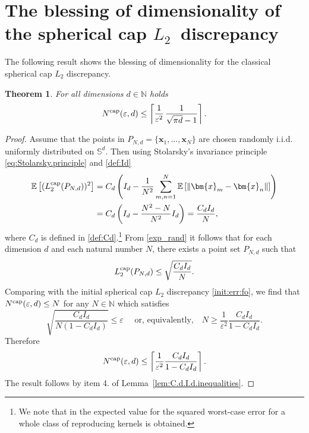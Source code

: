 \documentclass[12pt]{article}
\newcommand{\cp}{{\rm cap}}
\newtheorem{theorem}{Theorem}
\begin{document}
\section{The blessing of dimensionality of the spherical cap $L_2$~discrepancy}\label{sec:scd1}

The following result shows the blessing of dimensionality for the classical spherical cap $L_2$ discrepancy. 

\begin{theorem}
\label{thm:1}
For all dimensions $d \in \mathbb{N}$ holds
\begin{equation*}
N^{\cp}(\varepsilon, d) \leq \left\lceil \frac{1}{\varepsilon^2} \, \frac{1}{\sqrt{\pi  d} - 1} \right \rceil.
\end{equation*}
\end{theorem}

\begin{proof}
Assume that the points in $P_{N, d} = \{\bm{x}_1, \ldots, \bm{x}_N\}$ are chosen randomly i.i.d. uniformly distributed on $\mathbb{S}^d$. Then using Stolarsky's invariance principle \eqref{eq:Stolarsky.principle} and \eqref{def:Id}
\begin{equation}\label{exp_rand}
\begin{split}
\mathbb{E} \left[ (L^{\cp}_2(P_{N,d}))^2 \right] 
&= 
C_d \left( I_d - \frac{1}{N^2} \sum_{m,n=1}^N \mathbb{E}\left[ \| \bm{x}_m - \bm{x}_n\| \right] \right) \\
&= 
C_d \left( I_d - \frac{N^2-N}{N^2} I_d \right) = \frac{C_d I_d}{N},
\end{split}
\end{equation}
where $C_d$ is defined in \eqref{def:Cd}.\footnote{We note that in \cite[Section~7]{BSSW14} the expected value for the squared worst-case error for a whole class of reproducing kernels is obtained.} From \eqref{exp_rand} it follows that for each dimension $d$ and each natural number $N$, there exists a point set $P_{N,d}$ such that
\begin{equation*}
L_2^{\cp}(P_{N,d}) \le \sqrt{\frac{C_d I_d}{N}}.
\end{equation*}
Comparing with the initial spherical cap $L_2$ discrepancy \eqref{init:err:fo}, we find that $N^{\cp}(\varepsilon, d) \le N$ for any $N \in \mathbb{N}$ which satisfies
\begin{equation*}
\sqrt{\frac{C_d I_d}{N (1-C_d I_d)}} \le \varepsilon \quad \mbox{ or, equivalently,}\quad N \ge \frac{1}{\varepsilon^2} \frac{C_d I_d}{1-C_d I_d}.
\end{equation*}
Therefore
\begin{equation*}
N^{\cp}(\varepsilon, d) \le \left\lceil \frac{1}{\varepsilon^2} \frac{C_d I_d}{1-C_d I_d} \right\rceil.
\end{equation*}
The result follows by item 4. of Lemma~\ref{lem:C.d.I.d.inequalities}.
\end{proof}
\end{document}
